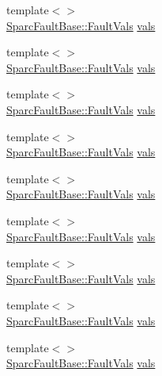 \begin{DoxyCompactItemize}
\item 
{\footnotesize template$<$$>$ }\\\hyperlink{structSparcISA_1_1SparcFaultBase_1_1FaultVals}{SparcFaultBase::FaultVals} \hyperlink{classSparcISA_1_1SparcFault_a88174a6ce260cacb323e0d78465e4c52}{vals}
\item 
{\footnotesize template$<$$>$ }\\\hyperlink{structSparcISA_1_1SparcFaultBase_1_1FaultVals}{SparcFaultBase::FaultVals} \hyperlink{classSparcISA_1_1SparcFault_a88174a6ce260cacb323e0d78465e4c52}{vals}
\item 
{\footnotesize template$<$$>$ }\\\hyperlink{structSparcISA_1_1SparcFaultBase_1_1FaultVals}{SparcFaultBase::FaultVals} \hyperlink{classSparcISA_1_1SparcFault_a88174a6ce260cacb323e0d78465e4c52}{vals}
\item 
{\footnotesize template$<$$>$ }\\\hyperlink{structSparcISA_1_1SparcFaultBase_1_1FaultVals}{SparcFaultBase::FaultVals} \hyperlink{classSparcISA_1_1SparcFault_a88174a6ce260cacb323e0d78465e4c52}{vals}
\item 
{\footnotesize template$<$$>$ }\\\hyperlink{structSparcISA_1_1SparcFaultBase_1_1FaultVals}{SparcFaultBase::FaultVals} \hyperlink{classSparcISA_1_1SparcFault_a88174a6ce260cacb323e0d78465e4c52}{vals}
\item 
{\footnotesize template$<$$>$ }\\\hyperlink{structSparcISA_1_1SparcFaultBase_1_1FaultVals}{SparcFaultBase::FaultVals} \hyperlink{classSparcISA_1_1SparcFault_a88174a6ce260cacb323e0d78465e4c52}{vals}
\item 
{\footnotesize template$<$$>$ }\\\hyperlink{structSparcISA_1_1SparcFaultBase_1_1FaultVals}{SparcFaultBase::FaultVals} \hyperlink{classSparcISA_1_1SparcFault_a88174a6ce260cacb323e0d78465e4c52}{vals}
\item 
{\footnotesize template$<$$>$ }\\\hyperlink{structSparcISA_1_1SparcFaultBase_1_1FaultVals}{SparcFaultBase::FaultVals} \hyperlink{classSparcISA_1_1SparcFault_a88174a6ce260cacb323e0d78465e4c52}{vals}
\item 
{\footnotesize template$<$$>$ }\\\hyperlink{structSparcISA_1_1SparcFaultBase_1_1FaultVals}{SparcFaultBase::FaultVals} \hyperlink{classSparcISA_1_1SparcFault_a88174a6ce260cacb323e0d78465e4c52}{vals}
\item 

\end{DoxyCompactItemize}
